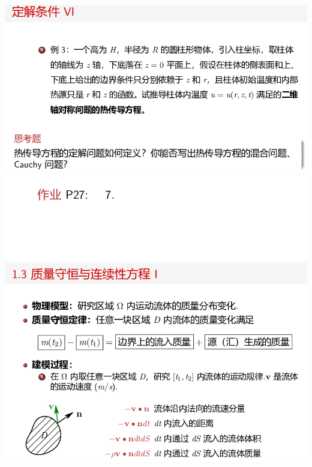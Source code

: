 \documentclass[11pt,a4paper]{ctexart}
\begin{document}
\begin{paracol}{2}
\includegraphics[width=\linewidth]{chap01_39.png}
\includegraphics[width=\linewidth]{chap01_40.png}
\includegraphics[width=\linewidth]{chap01_41.png}
\newpage



\end{paracol}
\end{document}
